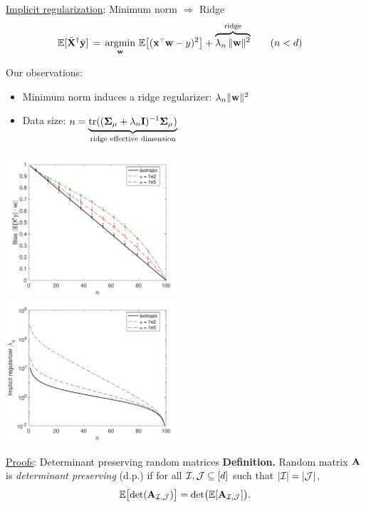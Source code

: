 \documentclass{beamer}
\begin{document}
\begin{frame}
\begin{columns}
\begin{column}{0.32\textwidth}
\begin{block}{\underline{Implicit regularization}: Minimum norm
    $\Rightarrow$ Ridge }
\begin{align*}
    \E[\Xb^\dagger\ybb]
    &\,=\,
      \argmin_\w\,\E\big[(\x^\top\w-y)^2\big] + \overbrace{\lambda_n
    \,\|\w\|^2}^{\text{ridge}}\qquad(n<d)
\end{align*}
\vspace{5mm}

  Our observations:\\
  \begin{itemize}
    \item Minimum norm induces a ridge regularizer:
      $\lambda_n\|\mathbf w\|^2$
\item Data size:
  $n=\underbrace{\mathrm{tr}((\mathbf{\Sigma}_\mu+\lambda_n\mathbf I)^{-1}\mathbf{\Sigma}_\mu)}_{\text{ridge
      effective dimension}}$
  \end{itemize}
\vspace{5mm}

  \includegraphics[width=0.495\textwidth]{../figs/descent-bias}~%
  \nobreak\includegraphics[width=0.495\textwidth]{../figs/descent-lambda}

\end{block}

\begin{block}{\underline{Proofs}: Determinant preserving random
      matrices}
\textbf{Definition.}
Random matrix $\mathbf A$ is \textit{determinant
  preserving} (d.p.) if for all $\mathcal I,\mathcal{J}\subseteq
  [d]$ such that $|\mathcal I|=|\mathcal{J}|$,
\begin{align*}
  \mathbb E\big[\!\det(\mathbf A_{\mathcal I,\mathcal{J}})\big] =
  \det\!\big(\mathbb E[\mathbf A_{\mathcal I,\mathcal{J}}]\big).
\end{align*}
\vspace{-2mm}


\end{block}
\end{column}
\end{columns}
\end{frame}
\end{document}
